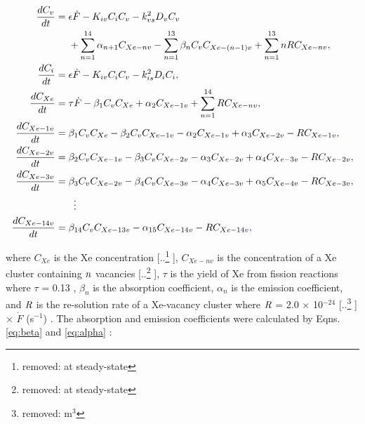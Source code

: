 \documentclass[preprint,12pt]{elsarticle}
\providecommand{\DIFadd}[1]{{\protect\color{blue} \sf #1}} %
\providecommand{\DIFdel}[1]{{\protect\color{red} [..\footnote{removed: #1} ]}} %
\providecommand{\DIFaddbegin}{} %
\providecommand{\DIFaddend}{} %
\providecommand{\DIFdelbegin}{} %
\providecommand{\DIFdelend}{} %
\newcommand{\DIFscaledelfig}{0.5}
\newlength{\DIFdelgraphicswidth} %
\newlength{\DIFdelgraphicsheight} %
\newcommand{\DIFaddincludegraphics}[2][]{{\color{blue}\fbox{\DIFOincludegraphics[#1]{#2}}}} %
\newcommand{\DIFdelincludegraphics}[2][]{%
\sbox{\DIFdelgraphicsbox}{\DIFOincludegraphics[#1]{#2}}%
\settoboxwidth{\DIFdelgraphicswidth}{\DIFdelgraphicsbox} %
\settoboxtotalheight{\DIFdelgraphicsheight}{\DIFdelgraphicsbox} %
\scalebox{\DIFscaledelfig}{%
\parbox[b]{\DIFdelgraphicswidth}{\usebox{\DIFdelgraphicsbox}\\[-\baselineskip] \rule{\DIFdelgraphicswidth}{0em}}\llap{\resizebox{\DIFdelgraphicswidth}{\DIFdelgraphicsheight}{%
\setlength{\unitlength}{\DIFdelgraphicswidth}%
\begin{picture}(1,1)%
\thicklines\linethickness{2pt} %
{\color[rgb]{1,0,0}\put(0,0){\framebox(1,1){}}}%
{\color[rgb]{1,0,0}\put(0,0){\line( 1,1){1}}}%
{\color[rgb]{1,0,0}\put(0,1){\line(1,-1){1}}}%
\end{picture}%
}\hspace*{3pt}}} %
} %
\DeclareRobustCommand{\DIFaddbegin}{\DIFOaddbegin \let\includegraphics\DIFaddincludegraphics} %
\DeclareRobustCommand{\DIFaddend}{\DIFOaddend \let\includegraphics\DIFOincludegraphics} %
\DeclareRobustCommand{\DIFdelbegin}{\DIFOdelbegin \let\includegraphics\DIFdelincludegraphics} %
\DeclareRobustCommand{\DIFdelend}{\DIFOaddend \let\includegraphics\DIFOincludegraphics} %
\begin{document}
\begin{align} 
\label{eqn:Xe_rate1}
\frac{dC_{v}}{dt}={}&\epsilon\dot{F}- K_{iv}C_{i}C_{v} - k_{vs}^{2}D_{v}C_{v} \\
&+\sum_{n=1}^{14} \alpha_{n+1}C_{Xe-nv} -\sum_{n=1}^{13} \beta_{n}C_{v}C_{Xe-(n-1)v} + \sum_{n=1}^{13} nRC_{Xe-nv}\DIFaddbegin \DIFadd{,}\DIFaddend \notag\\
\
\label{eqn:Xe_rate2}
\frac{dC_{i}}{dt}={}&\epsilon\dot{F} - K_{iv}C_{i}C_{v} - k_{is}^{2}D_{i}C_{i}\DIFaddbegin \DIFadd{, 
}\DIFaddend \\
\label{eqn:Xe_rate3}
\frac{dC_{Xe}}{dt}={}&\tau\dot{F} - \beta_{1}C_{v}C_{Xe} + \alpha_{2}C_{Xe-1v} + \sum_{n=1}^{14} RC_{Xe-nv}\DIFaddbegin \DIFadd{,}\DIFaddend \\
\label{eqn:Xe_rate4}
\frac{dC_{Xe-1v}}{dt}={}&\beta_{1}C_{v}C_{Xe} - \beta_{2}C_{v}C_{Xe-1v} - \alpha_{2}C_{Xe-1v} + \alpha_{3}C_{Xe-2v} - RC_{Xe-1v}\DIFaddbegin \DIFadd{,
}\DIFaddend \\
\label{eqn:Xe_rate5}
\frac{dC_{Xe-2v}}{dt}={}& \beta_{2}C_{v}C_{Xe-1v} - \beta_{3}C_{v}C_{Xe-2v} - \alpha_{3}C_{Xe-2v} + \alpha_{4}C_{Xe-3v} - RC_{Xe-2v}\DIFaddbegin \DIFadd{, 
}\DIFaddend \\
\label{eqn:Xe_rate6}
\frac{dC_{Xe-3v}}{dt}={}& \beta_{3}C_{v}C_{Xe-2v} - \beta_{4}C_{v}C_{Xe-3v} - \alpha_{4}C_{Xe-3v} + \alpha_{5}C_{Xe-4v} - RC_{Xe-3v}\DIFaddbegin \DIFadd{,
}\DIFaddend \\
&\vdotswithin{=} \notag \\
\label{eqn:Xe_rate7}
\frac{dC_{Xe-14v}}{dt}={}& \beta_{14}C_{v}C_{Xe-13v} - \alpha_{15}C_{Xe-14v} - RC_{Xe-14v}\DIFaddbegin \DIFadd{,
}\DIFaddend \end{align}

\noindent where $C_{Xe}$ is the Xe concentration\DIFdelbegin \DIFdel{at steady-state}\DIFdelend , $C_{Xe-nv}$ is the concentration of a Xe cluster containing $\it{n}$ vacancies\DIFdelbegin \DIFdel{at steady-state}\DIFdelend , $\tau$ is the yield of Xe from fission reactions where $\tau$ = 0.13 \cite{nichols2008handbook}, $\beta_{n}$ is the absorption coefficient, $\alpha_{n}$ is the emission coefficient, and $\it{R}$ is the re-solution rate of a Xe-vacancy cluster where $\it{R}$ = 2.0 $\times$ 10$^{-24}$ \DIFdelbegin \DIFdel{m$^{3}$ }\DIFdelend \DIFaddbegin \DIFadd{$\times$ $\dot{F}$ (s$^{-1}$) }\DIFaddend \cite{beeler2021microstructural}. The absorption and emission coefficients were calculated by Eqns. \ref{eq:beta} and \ref{eq:alpha} \cite{bai2017modeling}:\\
\end{document}

